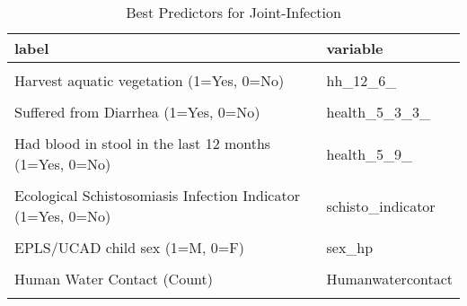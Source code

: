 \begin{table}[!h]
\centering
\caption{Best Predictors for Joint-Infection}
\centering
\begin{tabular}[t]{ll}
\toprule
label & variable\\
\midrule
\cellcolor{gray!10}{Individual's gender (1=Male, 0=Female)} & \cellcolor{gray!10}{hh\_gender\_}\\
Harvest aquatic vegetation (1=Yes, 0=No) & hh\_12\_6\_\\
\cellcolor{gray!10}{Fell ill in the last 12 months (1=Yes, 0=No)} & \cellcolor{gray!10}{health\_5\_2\_}\\
Suffered from Diarrhea (1=Yes, 0=No) & health\_5\_3\_3\_\\
\cellcolor{gray!10}{Received medication for schistosomiasis past 12mo (1=Yes, 0=No)} & \cellcolor{gray!10}{health\_5\_5\_}\\
\addlinespace
Had blood in stool in the last 12 months (1=Yes, 0=No) & health\_5\_9\_\\
\cellcolor{gray!10}{Prob. self gets bilharzia in next 12mo (1=Agree/Strongly agree)} & \cellcolor{gray!10}{beliefs\_01\_bin}\\
Ecological Schistosomiasis Infection Indicator (1=Yes, 0=No) & schisto\_indicator\\
\cellcolor{gray!10}{EPLS/UCAD child age (years)} & \cellcolor{gray!10}{age\_hp}\\
EPLS/UCAD child sex (1=M, 0=F) & sex\_hp\\
\addlinespace
\cellcolor{gray!10}{Bulinus Snail (Count)} & \cellcolor{gray!10}{Bulinus}\\
Human Water Contact (Count) & Humanwatercontact\\
\cellcolor{gray!10}{Infected Biomphalaria (Count)} & \cellcolor{gray!10}{InfectedBiomphalaria}\\
\bottomrule
\end{tabular}
\end{table}
